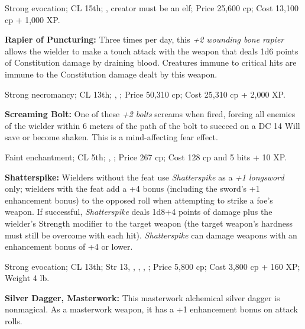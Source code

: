 Strong evocation; CL 15th; , creator must be an elf; Price 25,600 cp; Cost 13,100 cp + 1,000 XP.

\textbf{Rapier of Puncturing:} Three times per day, this \emph{+2 wounding bone rapier} allows the wielder to make a touch attack with the weapon that deals 1d6 points of Constitution damage by draining blood. Creatures immune to critical hits are immune to the Constitution damage dealt by this weapon.

Strong necromancy; CL 13th; , ; Price 50,310 cp; Cost 25,310 cp + 2,000 XP.

\textbf{Screaming Bolt:} One of these \emph{+2 bolts} screams when fired, forcing all enemies of the wielder within 6 meters of the path of the bolt to succeed on a DC 14 Will save or become shaken. This is a mind-affecting fear effect.

Faint enchantment; CL 5th; , ; Price 267 cp; Cost 128 cp and 5 bits + 10 XP.

\textbf{Shatterspike:} Wielders without the  feat use \emph{Shatterspike} as a \emph{+1 longsword} only; wielders with the  feat add a +4 bonus (including the sword's +1 enhancement bonus) to the opposed roll when attempting to strike a foe's weapon. If successful, \emph{Shatterspike} deals 1d8+4 points of damage plus the wielder's Strength modifier to the target weapon (the target weapon's hardness must still be overcome with each hit). \emph{Shatterspike} can damage weapons with an enhancement bonus of +4 or lower.

Strong evocation; CL 13th; Str 13, , , , ; Price 5,800 cp; Cost 3,800 cp + 160 XP; Weight 4 lb.



\textbf{Silver Dagger, Masterwork:} This masterwork alchemical silver dagger is nonmagical. As a masterwork weapon, it has a +1 enhancement bonus on attack rolls.

